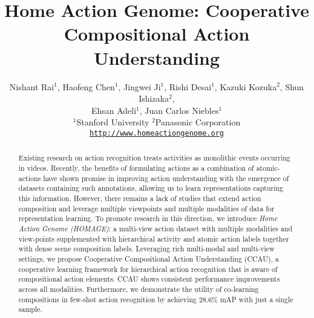 \documentclass[final]{cvpr}
\begin{document}
\title{Home Action Genome: Cooperative Compositional Action Understanding}

\author{Nishant Rai$^1$, Haofeng Chen$^1$, Jingwei Ji$^1$, Rishi Desai$^1$, Kazuki Kozuka$^2$, Shun Ishizaka$^2$, \\
Ehsan Adeli$^1$, Juan Carlos Niebles$^1$\\
$^1$Stanford University \quad $^2$Panasonic Corporation\\
{\tt\small \url{http://www.homeactiongenome.org}}
}

\maketitle

\begin{abstract}
Existing research on action recognition treats activities as monolithic events occurring in videos. Recently, the benefits of formulating actions as a combination of atomic-actions have shown promise in improving action understanding with the emergence of datasets containing such annotations, allowing us to learn representations capturing this information. However, there remains a lack of studies that extend action composition and leverage multiple viewpoints and multiple modalities of data for representation learning.
To promote research in this direction, we introduce \textit{Home Action Genome (HOMAGE)}: a multi-view action dataset with multiple modalities and view-points supplemented with hierarchical activity and atomic action labels together with dense scene composition labels. Leveraging rich multi-modal and multi-view settings, we propose Cooperative Compositional Action Understanding (CCAU), a cooperative learning framework for hierarchical action recognition that is aware of compositional action elements. CCAU shows consistent performance improvements across all modalities. Furthermore, we demonstrate the utility of co-learning compositions in few-shot action recognition by achieving 28.6\% mAP with just a single sample.
\end{abstract}

\vspace{-15pt}
\end{document}
